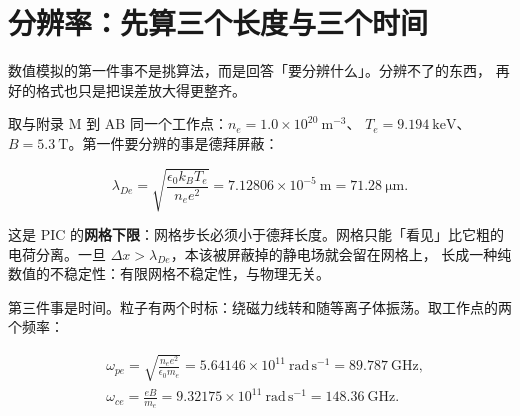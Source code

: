 
\section{分辨率：先算三个长度与三个时间}
\label{sec:app-ac-resolve}
\setlength{\emergencystretch}{3em}

数值模拟的第一件事不是挑算法，而是回答「要分辨什么」。分辨不了的东西，
再好的格式也只是把误差放大得更整齐。

取与附录 M 到 AB 同一个工作点：$n_e=1.0\times10^{20}\ \mathrm{m^{-3}}$、
$T_e=9.194\ \mathrm{keV}$、$B=5.3\ \mathrm{T}$。第一件要分辨的事是德拜屏蔽：

\begin{equation}
\lambda_{De}=\sqrt{\frac{\epsilon_0 k_B T_e}{n_e e^2}}
=7.12806\times10^{-5}\ \mathrm{m}=71.28\ \mathrm{\mu m}.
\label{eq:app-ac-debye}
\end{equation}

这是 PIC 的\textbf{网格下限}：网格步长必须小于德拜长度。网格只能「看见」比它粗的
电荷分离。一旦 $\Delta x>\lambda_{De}$，本该被屏蔽掉的静电场就会留在网格上，
长成一种纯数值的不稳定性：有限网格不稳定性，与物理无关。

第三件事是时间。粒子有两个时标：绕磁力线转和随等离子体振荡。取工作点的两个频率：

\begin{equation}
\begin{aligned}
&\omega_{pe}=\sqrt{\frac{n_e e^2}{\epsilon_0 m_e}}=5.64146\times10^{11}\ \mathrm{rad\,s^{-1}}
=89.787\ \mathrm{GHz},\\
&\omega_{ce}=\frac{eB}{m_e}=9.32175\times10^{11}\ \mathrm{rad\,s^{-1}}
=148.36\ \mathrm{GHz}.
\end{aligned}
\label{eq:app-ac-freq}
\end{equation}

